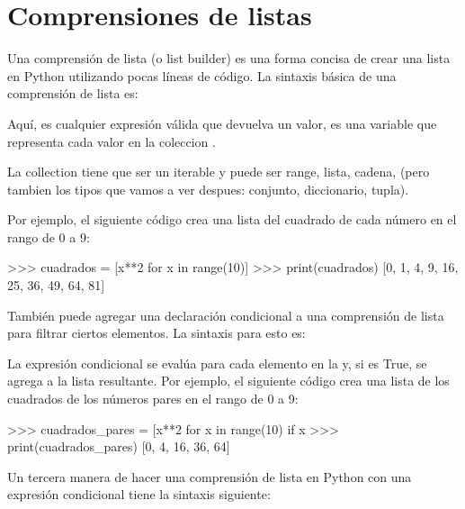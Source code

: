 \section{Comprensiones de listas}

Una comprensión de lista (o list builder) es una forma concisa de crear una lista en Python utilizando pocas líneas de código.
%
La sintaxis básica de una comprensión de lista es:

\begin{python}
\end{python}

Aquí,  es cualquier expresión válida que devuelva un valor,  es una variable que representa cada valor en la coleccion .

La collection tiene que ser un iterable y puede ser range, lista, cadena, (pero tambien los tipos que vamos a ver despues: conjunto, diccionario, tupla).


Por ejemplo, el siguiente código crea una lista del cuadrado de cada número en el rango de 0 a 9:

\begin{python}
>>> cuadrados = [x**2 for x in range(10)]
>>> print(cuadrados)
[0, 1, 4, 9, 16, 25, 36, 49, 64, 81]
\end{python}

También puede agregar una declaración condicional a una comprensión de lista para filtrar ciertos elementos. La sintaxis para esto es: 

\begin{python}
\end{python}


La expresión condicional  se evalúa para cada elemento en la  y, si es True, se agrega  a la lista resultante.
Por ejemplo, el siguiente código crea una lista de los cuadrados de los números pares en el rango de 0 a 9:

\begin{python}
>>> cuadrados_pares = [x**2 for x in range(10) if x %
>>> print(cuadrados_pares)
[0, 4, 16, 36, 64]
\end{python}

Un tercera manera de hacer una comprensión de lista en Python con una expresión condicional tiene la sintaxis siguiente:

\begin{python}
\end{python}

